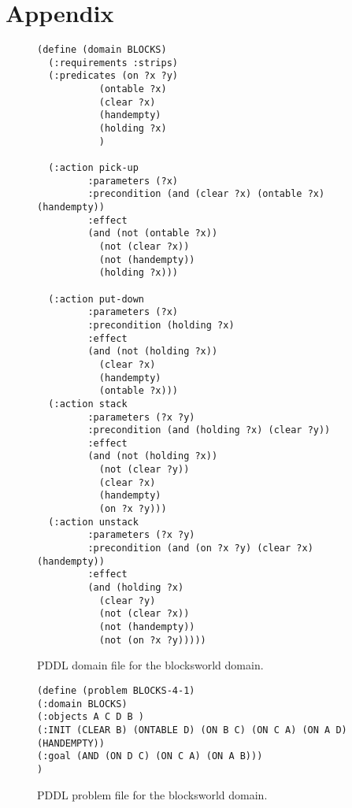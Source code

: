\section*{Appendix}
\label{sec:appendix}


\begin{figure}[hbtp!]
\begin{scriptsize}  
\begin{verbatim}
(define (domain BLOCKS)
  (:requirements :strips)
  (:predicates (on ?x ?y)
	       (ontable ?x)
	       (clear ?x)
	       (handempty)
	       (holding ?x)
	       )

  (:action pick-up
	     :parameters (?x)
	     :precondition (and (clear ?x) (ontable ?x) (handempty))
	     :effect
	     (and (not (ontable ?x))
		   (not (clear ?x))
		   (not (handempty))
		   (holding ?x)))

  (:action put-down
	     :parameters (?x)
	     :precondition (holding ?x)
	     :effect
	     (and (not (holding ?x))
		   (clear ?x)
		   (handempty)
		   (ontable ?x)))
  (:action stack
	     :parameters (?x ?y)
	     :precondition (and (holding ?x) (clear ?y))
	     :effect
	     (and (not (holding ?x))
		   (not (clear ?y))
		   (clear ?x)
		   (handempty)
		   (on ?x ?y)))
  (:action unstack
	     :parameters (?x ?y)
	     :precondition (and (on ?x ?y) (clear ?x) (handempty))
	     :effect
	     (and (holding ?x)
		   (clear ?y)
		   (not (clear ?x))
		   (not (handempty))
		   (not (on ?x ?y)))))

  \end{verbatim}
\end{scriptsize}  
\caption{\small PDDL domain file for the blocksworld domain.}
\label{fig:bw-domain}
\end{figure}


\begin{figure}[hbtp!]
\begin{scriptsize}  
  \begin{verbatim}
(define (problem BLOCKS-4-1)
(:domain BLOCKS)
(:objects A C D B )
(:INIT (CLEAR B) (ONTABLE D) (ON B C) (ON C A) (ON A D) (HANDEMPTY))
(:goal (AND (ON D C) (ON C A) (ON A B)))
)
  \end{verbatim}
\end{scriptsize}  
\caption{\small PDDL problem file for the blocksworld domain.}
\label{fig:bw-problem}
\end{figure}    

